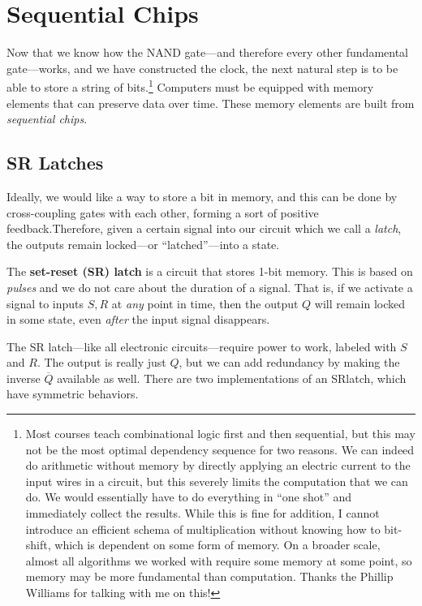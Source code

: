 \section{Sequential Chips}

  Now that we know how the NAND gate---and therefore every other fundamental gate---works, and we have constructed the clock, the next natural step is to be able to store a string of bits.\footnote{Most courses teach combinational logic first and then sequential, but this may not be the most optimal dependency sequence for two reasons. We can indeed do arithmetic without memory by directly applying an electric current to the input wires in a circuit, but this severely limits the computation that we can do. We would essentially have to do everything in ``one shot'' and immediately collect the results. While this is fine for addition, I cannot introduce an efficient schema of multiplication without knowing how to bit-shift, which is dependent on some form of memory. On a broader scale, almost all algorithms we worked with require some memory at some point, so memory may be more fundamental than computation. Thanks the Phillip Williams for talking with me on this!} Computers must be equipped with memory elements that can preserve data over time. These memory elements are built from \textit{sequential chips}. 

\subsection{SR Latches}

  Ideally, we would like a way to store a bit in memory, and this can be done by cross-coupling gates with each other, forming a sort of positive feedback.Therefore, given a certain signal into our circuit which we call a \textit{latch}, the outputs remain locked---or ``latched''---into a state. 

  \begin{definition}[SR Latch]
    The \textbf{set-reset (SR) latch} is a circuit that stores 1-bit memory. This is based on \textit{pulses} and we do not care about the duration of a signal. That is, if we activate a signal to inputs $S, R$ at \textit{any} point in time, then the output $Q$ will remain locked in some state, even \textit{after} the input signal disappears. 
  \end{definition}

  The SR latch---like all electronic circuits---require power to work, labeled with $S$ and $R$. The output is really just $Q$, but we can add redundancy by making the inverse $\overline{Q}$ available as well. There are two implementations of an SRlatch, which have symmetric behaviors. 


